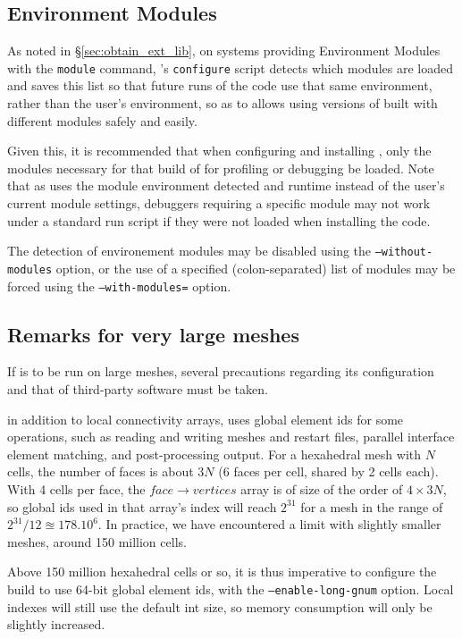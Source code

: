 \documentclass[a4paper,10pt,twoside]{csshortdoc}
\begin{document}
\subsection{Environment Modules\label{sec:config:envmode}}

As noted in \S\ref{sec:obtain_ext_lib}, on systems providing
Environment Modules with the {\tt module} command, \CS's {\tt configure}
script detects which modules are loaded and saves
this list so that future runs of the code use that same environment,
rather than the user's environment, so as to allows using versions of
\CS built with different modules safely and easily.

Given this, it is recommended that when configuring and installing
\CS, only the modules necessary for that build of for
profiling or debugging be loaded. Note that as \CS uses the module
environment detected and runtime instead of the user's current
module settings, debuggers requiring a specific module may
not work under a standard run script if they were not loaded when
installing the code.

The detection of environement modules may be disabled using the
\texttt{--without-modules} option,
or the use of a specified (colon-separated) list of modules
may be forced using the \texttt{--with-modules=} option.

\subsection{Remarks for very large meshes\label{sec:config:largemesh}}

If \CS is to be run on large meshes, several precautions regarding
its configuration and that of third-party software must be taken.

in addition to local connectivity arrays, \CS uses global element ids
for some operations, such as reading and writing meshes and restart files,
parallel interface element matching, and post-processing output.
For a hexahedral mesh with $N$ cells,
the number of faces is about $3N$ (6 faces per cell, shared by 2 cells each).
With 4 cells per face, the $face \rightarrow vertices$ array is of size
of the order of $4\times3N$, so global ids used in that array's index
will reach $2^{31}$ for a mesh in the range of $2^{31} / 12 \approxeq 178.10^6$.
In practice, we have encountered a limit with slightly smaller meshes,
around 150 million cells.

Above 150 million hexahedral cells or so, it is thus imperative to configure
the build to use 64-bit global element ids, with the
{\tt --enable-long-gnum} option. Local indexes will still use
the default {int} size, so memory consumption will only be slightly
increased.
\end{document}
